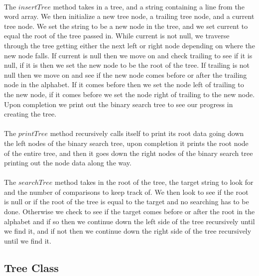 \documentclass[letterpaper, 10pt,DIV=13]{scrartcl}
\numberwithin{equation}{section} %
\numberwithin{figure}{section} %
\numberwithin{table}{section} %
\begin{document}
\paragraph{} The $insertTree$ method takes in a tree, and a string containing a line from the word array. We then initialize a new tree node, a trailing tree node, and a current tree node. We set the string to be a new node in the tree, and we set current to equal the root of the tree passed in. While current is not null, we traverse through the tree getting either the next left or right node depending on where the new node falls. If current is null then we move on and check trailing to see if it is null, if it is then we set the new node to be the root of the tree. If trailing is not null then we move on and see if the new node comes before or after the trailing node in the alphabet. If it comes before then we set the node left of trailing to the new node, if it comes before we set the node right of trailing to the new node. Upon completion we print out the binary search tree to see our progress in creating the tree.

\paragraph{} The $printTree$ method recursively calls itself to print its root data going down the left nodes of the binary search tree, upon completion it prints the root node of the entire tree, and then it goes down the right nodes of the binary search tree printing out the node data along the way.  

\paragraph{} The $searchTree$ method takes in the root of the tree, the target string to look for and the number of comparisons to keep track of. We then look to see if the root is null or if the root of the tree is equal to the target and no searching has to be done. Otherwise we check to see if the target comes before or after the root in the alphabet and if so then we continue down the left side of the tree recursively until we find it, and if not then we continue down the right side of the tree recursively until we find it. 

\subsection{Tree Class}
\end{document}
